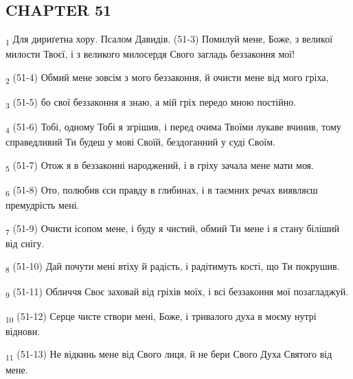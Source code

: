 \subsection{CHAPTER 51}
\begin{tcolorbox}
\textsubscript{1} Для дириґетна хору. Псалом Давидів. (51-3) Помилуй мене, Боже, з великої милости Твоєї, і з великого милосердя Свого загладь беззаконня мої!
\end{tcolorbox}
\begin{tcolorbox}
\textsubscript{2} (51-4) Обмий мене зовсім з мого беззаконня, й очисти мене від мого гріха,
\end{tcolorbox}
\begin{tcolorbox}
\textsubscript{3} (51-5) бо свої беззаконня я знаю, а мій гріх передо мною постійно.
\end{tcolorbox}
\begin{tcolorbox}
\textsubscript{4} (51-6) Тобі, одному Тобі я згрішив, і перед очима Твоїми лукаве вчинив, тому справедливий Ти будеш у мові Своїй, бездоганний у суді Своїм.
\end{tcolorbox}
\begin{tcolorbox}
\textsubscript{5} (51-7) Отож я в беззаконні народжений, і в гріху зачала мене мати моя.
\end{tcolorbox}
\begin{tcolorbox}
\textsubscript{6} (51-8) Ото, полюбив єси правду в глибинах, і в таємних речах виявляєш премудрість мені.
\end{tcolorbox}
\begin{tcolorbox}
\textsubscript{7} (51-9) Очисти ісопом мене, і буду я чистий, обмий Ти мене і я стану біліший від снігу.
\end{tcolorbox}
\begin{tcolorbox}
\textsubscript{8} (51-10) Дай почути мені втіху й радість, і радітимуть кості, що Ти покрушив.
\end{tcolorbox}
\begin{tcolorbox}
\textsubscript{9} (51-11) Обличчя Своє заховай від гріхів моїх, і всі беззаконня мої позагладжуй.
\end{tcolorbox}
\begin{tcolorbox}
\textsubscript{10} (51-12) Серце чисте створи мені, Боже, і тривалого духа в моєму нутрі віднови.
\end{tcolorbox}
\begin{tcolorbox}
\textsubscript{11} (51-13) Не відкинь мене від Свого лиця, й не бери Свого Духа Святого від мене.
\end{tcolorbox}

